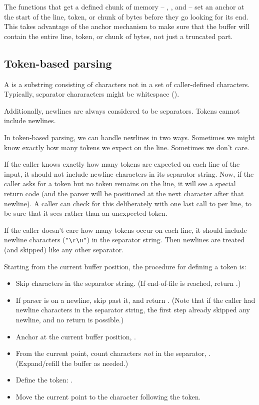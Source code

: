 The functions that get a defined chunk of memory --
, , and
 -- set an anchor at the start of the
line, token, or chunk of bytes before they go looking for its end.
This takes advantage of the anchor mechanism to make sure that the
buffer will contain the entire line, token, or chunk of bytes, not just a
truncated part.


\subsection{Token-based parsing}

A  is a substring consisting of characters not in a set
of caller-defined  characters. Typically, separator
chararacters might be whitespace ().

Additionally, newlines are always considered to be separators. Tokens
cannot include newlines. 

In token-based parsing, we can handle newlines in two ways. Sometimes
we might know exactly how many tokens we expect on the line. Sometimes
we don't care. 

If the caller knows exactly how many tokens are expected on each line
of the input, it should not include newline characters in its
separator string. Now, if the caller asks for a token but no token
remains on the line, it will see a special  return code
(and the parser will be positioned at the next character after that
newline). A caller can check for this deliberately with one last call
to  per line, to be sure that it sees
 rather than an unexpected token.

If the caller doesn't care how many tokens occur on each line, it
should include newline characters (\verb+"\r\n"+) in the separator
string. Then newlines are treated (and skipped) like any other
separator.

Starting from the current buffer position, the procedure for defining
a token is:

\begin{itemize}
\item Skip characters in the separator string. (If end-of-file is
      reached, return .)
\item If parser is on a newline, skip past it, and return
      . (Note that if the caller had newline characters
      in the separator string, the first step already skipped any
      newline, and no  return is possible.)
\item Anchor at the current buffer position, .
\item From the current point, count characters \emph{not} in the
      separator, . (Expand/refill the buffer as needed.)
\item Define the token: .
\item Move the current point to the character following the token.
\end{itemize}

